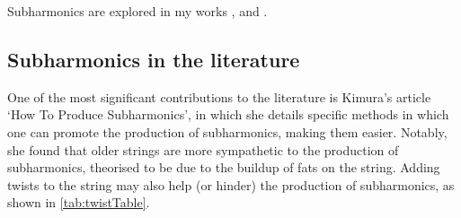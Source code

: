 Subharmonics are explored in my works , and .


\subsection{Subharmonics in the literature}

One of the most significant contributions to the literature is Kimura's article `How To Produce Subharmonics', in which she details specific methods in which one can promote the production of subharmonics, making them easier.\autocite[]{kimuraHowProduceSubharmonics1999}
Notably, she found that older strings are more sympathetic to the production of subharmonics, theorised to be due to the buildup of fats on the string.
Adding twists to the string may also help (or hinder) the production of subharmonics, as shown in \autoref{tab:twistTable}.\autocite[]{kimuraHowProduceSubharmonics1999}

